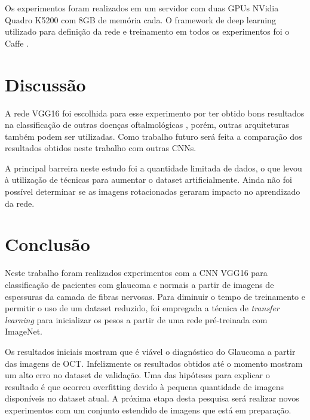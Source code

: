 \documentclass[conference]{IEEEtran}
\begin{document}
  Os experimentos foram realizados em um servidor com duas GPUs NVidia Quadro K5200 com 8GB de memória cada. O framework de deep learning utilizado para definição da rede e treinamento em todos os experimentos foi o Caffe \cite{jia2014caffe}.

\section{Discussão}


A rede VGG16 foi escolhida para esse experimento por ter obtido bons resultados na classificação de outras doenças oftalmológicas \cite{li2017, lee2017}, porém, outras arquiteturas também podem ser utilizadas. Como trabalho futuro será feita a comparação dos resultados obtidos neste trabalho com outras CNNs.

A principal barreira neste estudo foi a quantidade limitada de dados, o que levou à utilização de técnicas para aumentar o dataset artificialmente. Ainda não foi possível determinar se as imagens rotacionadas geraram impacto no aprendizado da rede. 


\section{Conclusão}

Neste trabalho foram realizados experimentos com a CNN VGG16 para classificação de pacientes com glaucoma e normais a partir de imagens de espessuras da camada de fibras nervosas. Para diminuir o tempo de treinamento e permitir o uso de um dataset reduzido, foi empregada a técnica de \textit{transfer learning} para inicializar os pesos a partir de uma rede pré-treinada com ImageNet.

Os resultados iniciais mostram que é viável o diagnóstico do Glaucoma a partir das imagens de OCT. Infelizmente os resultados obtidos até o momento mostram um alto erro no dataset de validação. Uma das hipóteses para explicar o resultado é que ocorreu overfitting devido à pequena quantidade de imagens disponíveis no dataset atual. A próxima etapa desta pesquisa será realizar novos experimentos com um conjunto estendido de imagens que está em preparação.




\end{document}

